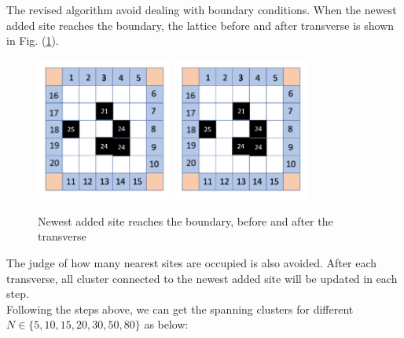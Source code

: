 \documentclass[12pt]{article}
\begin{document}
The revised algorithm avoid dealing with boundary conditions. When the newest added site reaches the boundary, the lattice before and after transverse is shown in Fig. (\ref{Boundary3}). \\
\begin{figure}[h]
\centering
\includegraphics[width=0.4\textwidth]{Boundary4}
\includegraphics[width=0.4\textwidth]{Boundary5}
\caption{Newest added site reaches the boundary, before and after the transverse}
\label{Boundary3}
\end{figure}
The judge of how many nearest sites are occupied is also avoided. After each transverse, all cluster connected to the newest added site will be updated in each step. \\
Following the steps above, we can get the spanning clusters for different $N\in\{5, 10, 15, 20, 30, 50, 80\}$ as below:
\end{document}
